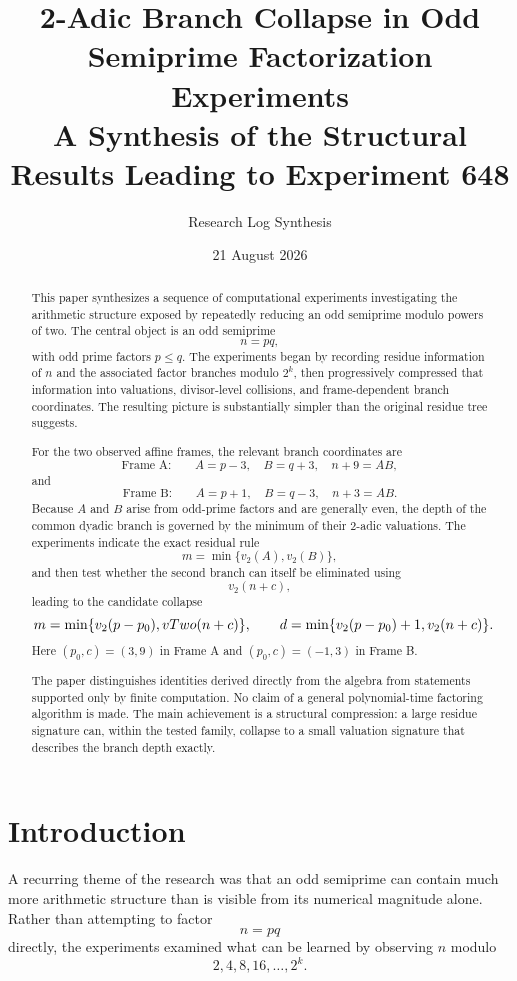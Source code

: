 \documentclass[11pt,a4paper]{article}
\title{\textbf{2-Adic Branch Collapse in Odd Semiprime Factorization Experiments}\\
\large A Synthesis of the Structural Results Leading to Experiment 648}
\author{Research Log Synthesis}
\date{21 August 2026}
\newcommand{\vTwo}{v_2}
\begin{document}
\maketitle

\begin{abstract}
This paper synthesizes a sequence of computational experiments investigating the arithmetic structure exposed by repeatedly reducing an odd semiprime modulo powers of two. The central object is an odd semiprime
\[
    n=pq,
\]
with odd prime factors $p\le q$. The experiments began by recording residue information of $n$ and the associated factor branches modulo $2^k$, then progressively compressed that information into valuations, divisor-level collisions, and frame-dependent branch coordinates. The resulting picture is substantially simpler than the original residue tree suggests.

For the two observed affine frames, the relevant branch coordinates are
\[
    \text{Frame A:}\qquad A=p-3,\quad B=q+3,\quad n+9=AB,
\]
and
\[
    \text{Frame B:}\qquad A=p+1,\quad B=q-3,\quad n+3=AB.
\]
Because $A$ and $B$ arise from odd-prime factors and are generally even, the depth of the common dyadic branch is governed by the minimum of their $2$-adic valuations. The experiments indicate the exact residual rule
\[
    m=\min\{\vTwo(A),\vTwo(B)\},
\]
and then test whether the second branch can itself be eliminated using
\[
    \vTwo(n+c),
\]
leading to the candidate collapse
\[
    m=\min\{\vTwo(p-p_0),\\vTwo(n+c)\},
\qquad
    d=\min\{\vTwo(p-p_0)+1,\vTwo(n+c)\}.
\]
Here $(p_0,c)=(3,9)$ in Frame A and $(p_0,c)=(-1,3)$ in Frame B.

The paper distinguishes identities derived directly from the algebra from statements supported only by finite computation. No claim of a general polynomial-time factoring algorithm is made. The main achievement is a structural compression: a large residue signature can, within the tested family, collapse to a small valuation signature that describes the branch depth exactly.
\end{abstract}

\section{Introduction}

A recurring theme of the research was that an odd semiprime can contain much more arithmetic structure than is visible from its numerical magnitude alone. Rather than attempting to factor
\[
    n=pq
\]
directly, the experiments examined what can be learned by observing $n$ modulo
\[
    2,4,8,16,\ldots,2^k.
\]
\end{document}

